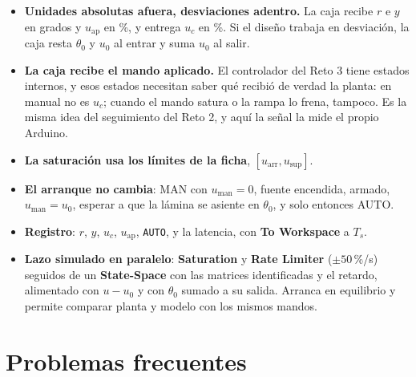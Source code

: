 \documentclass[11pt,letterpaper]{article}
\newcommand{\blq}[1]{\textsf{\textbf{#1}}}                 %
\newcommand{\sen}[1]{\texttt{\detokenize{#1}}}             %
\begin{document}
\begin{itemize}[leftmargin=12pt]
  \item \textbf{Unidades absolutas afuera, desviaciones adentro.} La caja recibe $r$ e $y$ en grados y $u_\text{ap}$ en \%, y entrega $u_c$ en \%. Si el diseño trabaja en desviación, la caja resta $\theta_0$ y $u_0$ al entrar y suma $u_0$ al salir.
  \item \textbf{La caja recibe el mando aplicado.} El controlador del Reto 3 tiene estados internos, y esos estados necesitan saber qué recibió de verdad la planta: en manual no es $u_c$; cuando el mando satura o la rampa lo frena, tampoco. Es la misma idea del seguimiento del Reto 2, y aquí la señal la mide el propio Arduino.
  \item \textbf{La saturación usa los límites de la ficha}, $[u_\text{arr},u_\text{sup}]$.
  \item \textbf{El arranque no cambia}: MAN con $u_\text{man}=0$, fuente encendida, armado, $u_\text{man}=u_0$, esperar a que la lámina se asiente en $\theta_0$, y solo entonces AUTO.
  \item \textbf{Registro}: $r$, $y$, $u_c$, $u_\text{ap}$, \texttt{AUTO}, \sen{t_ard} y la latencia, con \blq{To Workspace} a $T_s$.
  \item \textbf{Lazo simulado en paralelo}: \blq{Saturation} y \blq{Rate Limiter} ($\pm50$\,\%/s) seguidos de un \blq{State-Space} con las matrices identificadas y el retardo, alimentado con $u-u_0$ y con $\theta_0$ sumado a su salida. Arranca en equilibrio y permite comparar planta y modelo con los mismos mandos.
\end{itemize}

\section{Problemas frecuentes}
\end{document}
